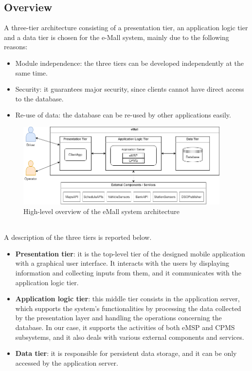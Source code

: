 \documentclass[../main.tex]{subfiles}
\begin{document}
\subsection{Overview}
A three-tier architecture consisting of a presentation tier, an application logic tier and a data tier is chosen for the e-Mall system, mainly due to the following reasons:
\begin{itemize}
    \item Module independence: the three tiers can be developed independently at the same time.
    \item Security: it guarantees major security, since clients cannot have direct access to the database.
    \item Re-use of data: the database can be re-used by other applications easily.
\end{itemize}

\begin{figure}[H]
    \centering
    \includegraphics[width=0.95\textwidth]{images/Overview.png}
    \caption{High-level overview of the eMall system architecture}
    \label{fig:overview}
\end{figure}
\\
A description of the three tiers is reported below.
\begin{itemize}
    \item \textbf{Presentation tier}: it is the top-level tier of the designed mobile application with a graphical user interface. It interacts with the users by displaying information and collecting inputs from them, and it communicates with the application logic tier. 
    \item \textbf{Application logic tier}: this middle tier consists in the application server, which supports the system's functionalities by processing the data collected by the presentation layer and handling the operations concerning the database. In our case, it supports the activities of both eMSP and CPMS subsystems, and it also deals with various external components and services. 
    \item \textbf{Data tier}: it is responsible for persistent data storage, and it can be only accessed by the application server.
\end{itemize}
\end{document}
